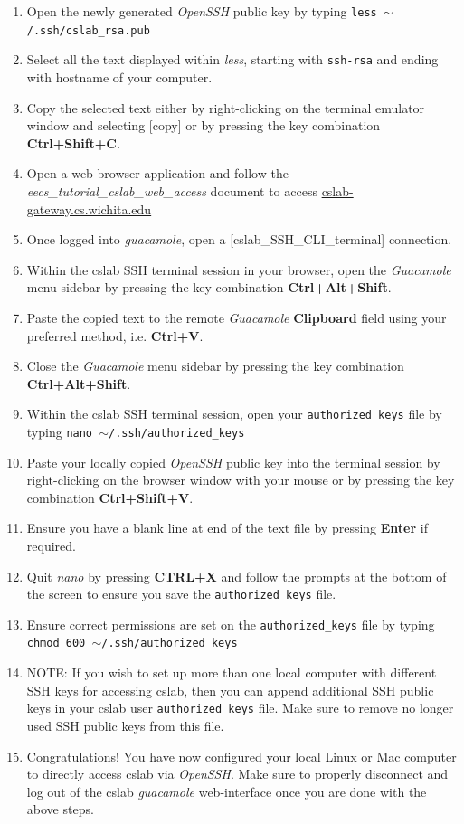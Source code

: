 \documentclass[12pt]{article}
\begin{document}
\begin{flushleft}
\begin{enumerate}
  \item Open the newly generated \textit{OpenSSH} public key by typing \break
  \texttt{less $\sim$/.ssh/cslab\_rsa.pub}
  \item Select all the text displayed within \textit{less}, starting with \texttt{ssh-rsa} and ending with hostname of your computer.
  \item Copy the selected text either by right-clicking on the terminal emulator window and selecting [copy] or by pressing the key combination \textbf{Ctrl+Shift+C}.
  \item Open a web-browser application and follow the \textit{eecs\_tutorial\_cslab\_web\_access} document to access \href{https://cslab-gateway.cs.wichita.edu/}{cslab-gateway.cs.wichita.edu}
  \item Once logged into \textit{guacamole}, open a [cslab\_SSH\_CLI\_terminal] connection.
  \item Within the cslab SSH terminal session in your browser, open the \textit{Guacamole} menu sidebar by pressing the key combination \textbf{Ctrl+Alt+Shift}.
  \item Paste the copied text to the remote \textit{Guacamole} \textbf{Clipboard} field using your preferred method, i.e. \textbf{Ctrl+V}.
  \item Close the \textit{Guacamole} menu sidebar by pressing the key combination \textbf{Ctrl+Alt+Shift}.
  \item Within the cslab SSH terminal session, open your \texttt{authorized\_keys} file by typing \break
  \texttt{nano $\sim$/.ssh/authorized\_keys}
  \item Paste your locally copied \textit{OpenSSH} public key into the terminal session by right-clicking on the browser window with your mouse or by pressing the key combination \textbf{Ctrl+Shift+V}.
  \item Ensure you have a blank line at end of the text file by pressing \textbf{Enter} if required.
  \item Quit \textit{nano} by pressing \textbf{CTRL+X} and follow the prompts at the bottom of the screen to ensure you save the \texttt{authorized\_keys} file.
  \item Ensure correct permissions are set on the \texttt{authorized\_keys} file by typing \break
  \texttt{chmod 600 $\sim$/.ssh/authorized\_keys}
  \item NOTE: If you wish to set up more than one local computer with different SSH keys for accessing cslab, then you can append additional SSH public keys in your cslab user \texttt{authorized\_keys} file. Make sure to remove no longer used SSH public keys from this file.
  \item Congratulations! You have now configured your local Linux or Mac computer to directly access cslab via \textit{OpenSSH}. Make sure to properly disconnect and log out of the cslab \textit{guacamole} web-interface once you are done with the above steps.
\end{enumerate}


\end{flushleft}
\end{document}

